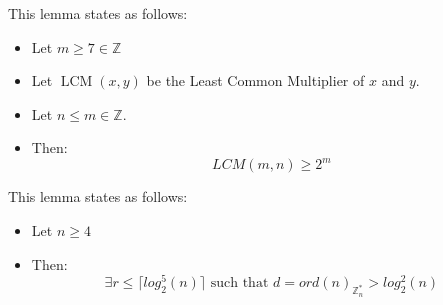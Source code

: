 \begin{lemma}\label{nair_lemma}
    This lemma states as follows:
    \begin{itemize}
        \item Let $m \geq 7 \in \mathbb{Z}$
        \item Let $\operatorname{LCM}(x,y)$ be the Least Common Multiplier of $x$ and $y$.
        \item Let $n \leq m \in \mathbb{Z}$.
        \item Then: \[LCM(m,n) \geq 2^{m}\]
    \end{itemize}
\end{lemma}

\begin{lemma}\label{aks_lemma}
    This lemma states as follows:
    \begin{itemize}
        \item Let $n \geq 4$
        \item Then: \[\exists r \leq \lceil log_{2}^{5}(n) \rceil \text{ such that } d = ord(n)_{\mathbb{Z}_n^*} > log_2^2(n)\]
    \end{itemize}
\end{lemma}
